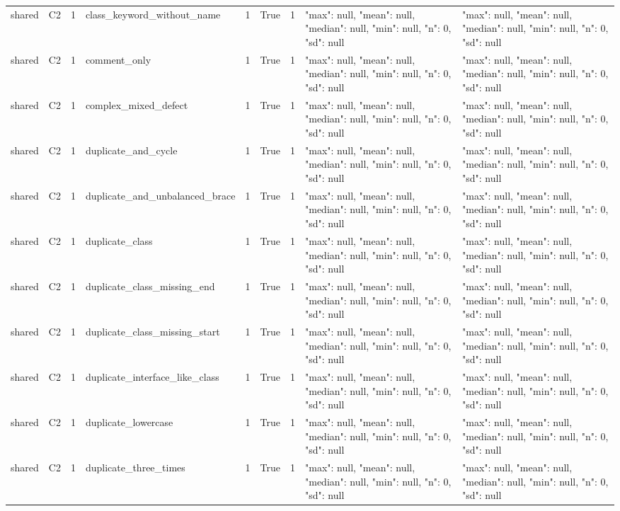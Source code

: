 \begin{tabular}{lllllllll}
shared & C2 & 1 & class\_keyword\_without\_name & 1 & True & 1 & {"max": null, "mean": null, "median": null, "min": null, "n": 0, "sd": null} & {"max": null, "mean": null, "median": null, "min": null, "n": 0, "sd": null} \\
shared & C2 & 1 & comment\_only & 1 & True & 1 & {"max": null, "mean": null, "median": null, "min": null, "n": 0, "sd": null} & {"max": null, "mean": null, "median": null, "min": null, "n": 0, "sd": null} \\
shared & C2 & 1 & complex\_mixed\_defect & 1 & True & 1 & {"max": null, "mean": null, "median": null, "min": null, "n": 0, "sd": null} & {"max": null, "mean": null, "median": null, "min": null, "n": 0, "sd": null} \\
shared & C2 & 1 & duplicate\_and\_cycle & 1 & True & 1 & {"max": null, "mean": null, "median": null, "min": null, "n": 0, "sd": null} & {"max": null, "mean": null, "median": null, "min": null, "n": 0, "sd": null} \\
shared & C2 & 1 & duplicate\_and\_unbalanced\_brace & 1 & True & 1 & {"max": null, "mean": null, "median": null, "min": null, "n": 0, "sd": null} & {"max": null, "mean": null, "median": null, "min": null, "n": 0, "sd": null} \\
shared & C2 & 1 & duplicate\_class & 1 & True & 1 & {"max": null, "mean": null, "median": null, "min": null, "n": 0, "sd": null} & {"max": null, "mean": null, "median": null, "min": null, "n": 0, "sd": null} \\
shared & C2 & 1 & duplicate\_class\_missing\_end & 1 & True & 1 & {"max": null, "mean": null, "median": null, "min": null, "n": 0, "sd": null} & {"max": null, "mean": null, "median": null, "min": null, "n": 0, "sd": null} \\
shared & C2 & 1 & duplicate\_class\_missing\_start & 1 & True & 1 & {"max": null, "mean": null, "median": null, "min": null, "n": 0, "sd": null} & {"max": null, "mean": null, "median": null, "min": null, "n": 0, "sd": null} \\
shared & C2 & 1 & duplicate\_interface\_like\_class & 1 & True & 1 & {"max": null, "mean": null, "median": null, "min": null, "n": 0, "sd": null} & {"max": null, "mean": null, "median": null, "min": null, "n": 0, "sd": null} \\
shared & C2 & 1 & duplicate\_lowercase & 1 & True & 1 & {"max": null, "mean": null, "median": null, "min": null, "n": 0, "sd": null} & {"max": null, "mean": null, "median": null, "min": null, "n": 0, "sd": null} \\
shared & C2 & 1 & duplicate\_three\_times & 1 & True & 1 & {"max": null, "mean": null, "median": null, "min": null, "n": 0, "sd": null} & {"max": null, "mean": null, "median": null, "min": null, "n": 0, "sd": null} \\

\end{tabular}
